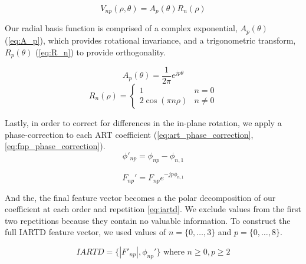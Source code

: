 \begin{equation}
	\label{eq:V_np}
	V_{np}(\rho,\theta) = A_{p}(\theta)R_{n}(\rho)
\end{equation}

Our radial basis function is comprised of a complex exponential, $A_{p}(\theta)$ (\cref{eq:A_p}), which provides rotational invariance, and a trigonometric transform, $R_{p}(\theta)$ (\cref{eq:R_n}) to provide orthogonality.

\begin{equation}
	\label{eq:A_p}
	A_{p}(\theta) = \dfrac{1}{2\pi}e^{jp\theta}
\end{equation}
\begin{equation}
	\label{eq:R_n}
	R_{n}(\rho) =
	\begin{cases}
		1                   & n=0     \\
		2 \cos (\pi n \rho) & n \ne 0
	\end{cases}
\end{equation}

Lastly, in order to correct for differences in the in-plane rotation, we apply a phase-correction to each ART coefficient (\cref{eq:art_phase_correction}, \cref{eq:fnp_phase_correction}).
\begin{equation}
	\label{eq:art_phase_correction}
	\phi'_{np} = \phi_{np} - \phi_{n,1}
\end{equation}

\begin{equation}
	\label{eq:fnp_phase_correction}
	F_{np}' = F_{np}e^{-jp\phi_{n,1}}
\end{equation}

And the, the final feature vector becomes a the polar decomposition of our coefficient at each order and repetition \cref{eq:iartd}.
We exclude values from the first two repetitions because they contain no valuable information.
To construct the full IARTD feature vector, we used values of $n=\{0, \dots, 3 \}$ and $p=\{0, \dots, 8\}$.

\begin{equation}
	\label{eq:iartd}
	IARTD = \{|F'_{np}|, \phi_{np}'\} \text{ where } n \ge 0, p \ge 2
\end{equation}

